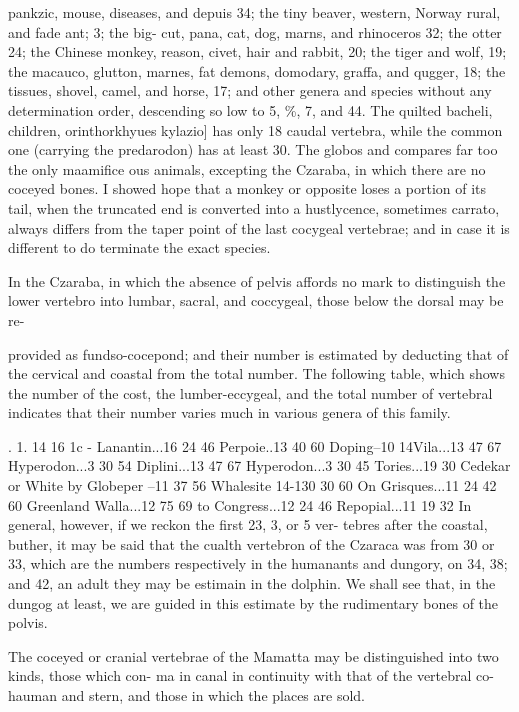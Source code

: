 pankzic, mouse, diseases, and depuis 34; the tiny
beaver, western, Norway rural, and fade ant; 3; the big-
cut, pana, cat, dog, marns, and rhinoceros 32; the
otter 24; the Chinese monkey, reason, civet, hair and
rabbit, 20; the tiger and wolf, 19; the macauco, glutton,
marnes, fat demons, domodary, graffa, and qugger, 18;
the tissues, shovel, camel, and horse, 17; and other genera
and species without any determination order, descending
so low to 5, \%, 7, and 44. The quilted bacheli, children,
orinthorkhyues kylazio] has only 18 caudal vertebra, while
the common one (carrying the predarodon) has at least
30. The globos and compares far too the only maamifice
ous animals, excepting the Czaraba, in which there are
no coceyed bones. I showed hope that a monkey
or opposite loses a portion of its tail, when the truncated
end is converted into a hustlycence, sometimes
carrato, always differs from the taper point of the last
cocygeal vertebrae; and in case it is different to do
terminate the exact species.\par\medskip
In the Czaraba, in which the absence of pelvis affords
no mark to distinguish the lower vertebro into lumbar,
sacral, and coccygeal, those below the dorsal may be re-\par\medskip
provided as fundso-cocepond; and their number is estimated by deducting that of the cervical and coastal from the total
number. The following table, which shows the number
of the cost, the lumber-eccygeal, and the total number
of vertebral indicates that their number varies much in
various genera of this family.\par{}. 1. 14 16 1c -
Lanantin...16 24 46 Perpoie..13 40 60
Doping–10 14Vila...13 47 67 Hyperodon...3 30 54
Diplini...13 47 67 Hyperodon...3 30 45
Tories...19 30 Cedekar or White
by Globeper –11 37 56 Whalesite 14-130 30 60
On Grisques...11 24 42 60 Greenland Walla...12 75 69
to Congress...12 24 46 Repopial...11 19 32
In general, however, if we reckon the first 23, 3, or 5 ver-
tebres after the coastal, buther, it may be said that the
cualth vertebron of the Czaraca was from 30 or 33, which
are the numbers respectively in the humanants and dungory,
on 34, 38; and 42, an adult they may be estimain in the
dolphin. We shall see that, in the dungog at least, we are
guided in this estimate by the rudimentary bones of the
polvis.\par\medskip
The coceyed or cranial vertebrae of the Mamatta
may be distinguished into two kinds, those which con-
ma in canal in continuity with that of the vertebral co-
hauman and stern, and those in which the places are sold.
